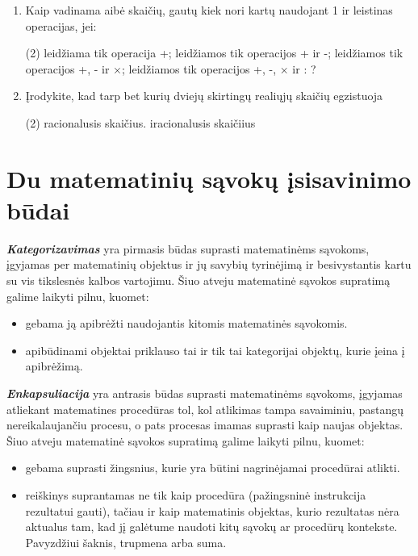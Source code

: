 \documentclass{article}
\begin{document}
\begin{enumerate}
\item Kaip vadinama aibė skaičių, gautų kiek nori kartų naudojant 1 ir leistinas operacijas, jei:
\begin{tasks}(2)
\task leidžiama tik operacija +; 
\task leidžiamos tik operacijos + ir -; 
\task leidžiamos tik operacijos +, - ir $\times$; 
\task leidžiamos tik operacijos +, -, $\times$ ir : ? 
\end{tasks}
\item Įrodykite, kad tarp bet kurių dviejų skirtingų realiųjų skaičių egzistuoja
\begin{tasks}(2)
\task racionalusis skaičius.
\task iracionalusis skaičiius
\end{tasks}
\end{enumerate}

\section{Du matematinių sąvokų įsisavinimo būdai}

\textit{\textbf{Kategorizavimas}} yra pirmasis būdas suprasti matematinėms sąvokoms, įgyjamas per matematinių objektus ir jų savybių tyrinėjimą ir besivystantis kartu su vis tikslesnės kalbos vartojimu. Šiuo atveju matematinė sąvokos supratimą galime laikyti pilnu, kuomet:
\begin{itemize}
\item gebama ją apibrėžti naudojantis kitomis matematinės sąvokomis. 
\item apibūdinami objektai priklauso tai ir tik tai kategorijai objektų, kurie įeina į apibrėžimą. 
\end{itemize}

\textbf{\textit{Enkapsuliacija}} yra antrasis būdas suprasti matematinėms sąvokoms, įgyjamas atliekant matematines procedūras tol, kol atlikimas tampa savaiminiu, pastangų nereikalaujančiu procesu, o pats procesas imamas suprasti kaip naujas objektas. Šiuo atveju matematinė sąvokos supratimą galime laikyti pilnu, kuomet:
\begin{itemize}
\item gebama suprasti žingsnius, kurie yra būtini nagrinėjamai procedūrai atlikti.
\item reiškinys suprantamas ne tik kaip procedūra (pažingsninė instrukcija rezultatui gauti), tačiau ir kaip matematinis objektas, kurio rezultatas nėra aktualus tam, kad jį galėtume naudoti kitų sąvokų ar procedūrų kontekste. Pavyzdžiui šaknis, trupmena arba suma.
\end{itemize}
\end{document}
